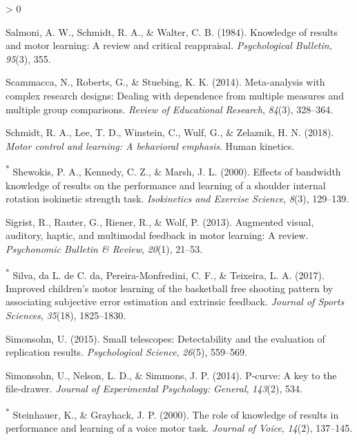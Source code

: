 \documentclass[
  english,
  man,mask,floatsintext]{apa7}
\newlength{\cslhangindent}
\newenvironment{CSLReferences}[2] %
 {%
  \setlength{\parindent}{0pt}
  \ifodd #1 \everypar{\setlength{\hangindent}{\cslhangindent}}\ignorespaces\fi
  \ifnum #2 > 0
  \setlength{\parskip}{#2\baselineskip}
  \fi
 }%
 {}
\begin{document}
\begin{CSLReferences}{1}{0}
\leavevmode\hypertarget{ref-Salmoni1984}{}%
Salmoni, A. W., Schmidt, R. A., \& Walter, C. B. (1984). Knowledge of results and motor learning: A review and critical reappraisal. \emph{Psychological Bulletin}, \emph{95}(3), 355.

\leavevmode\hypertarget{ref-Scammacca2014}{}%
Scammacca, N., Roberts, G., \& Stuebing, K. K. (2014). Meta-analysis with complex research designs: Dealing with dependence from multiple measures and multiple group comparisons. \emph{Review of Educational Research}, \emph{84}(3), 328--364.

\leavevmode\hypertarget{ref-Schmidt2018}{}%
Schmidt, R. A., Lee, T. D., Winstein, C., Wulf, G., \& Zelaznik, H. N. (2018). \emph{Motor control and learning: A behavioral emphasis}. Human kinetics.

\leavevmode\hypertarget{ref-Shewokis2000}{}%
\textsuperscript{*} Shewokis, P. A., Kennedy, C. Z., \& Marsh, J. L. (2000). Effects of bandwidth knowledge of results on the performance and learning of a shoulder internal rotation isokinetic strength task. \emph{Isokinetics and Exercise Science}, \emph{8}(3), 129--139.

\leavevmode\hypertarget{ref-Sigrist2013}{}%
Sigrist, R., Rauter, G., Riener, R., \& Wolf, P. (2013). Augmented visual, auditory, haptic, and multimodal feedback in motor learning: A review. \emph{Psychonomic Bulletin \& Review}, \emph{20}(1), 21--53.

\leavevmode\hypertarget{ref-Silva2017}{}%
\textsuperscript{*} Silva, da L. de C. da, Pereira-Monfredini, C. F., \& Teixeira, L. A. (2017). Improved children's motor learning of the basketball free shooting pattern by associating subjective error estimation and extrinsic feedback. \emph{Journal of Sports Sciences}, \emph{35}(18), 1825--1830.

\leavevmode\hypertarget{ref-Simonsohn2015}{}%
Simonsohn, U. (2015). Small telescopes: Detectability and the evaluation of replication results. \emph{Psychological Science}, \emph{26}(5), 559--569.

\leavevmode\hypertarget{ref-Simonsohn2014}{}%
Simonsohn, U., Nelson, L. D., \& Simmons, J. P. (2014). P-curve: A key to the file-drawer. \emph{Journal of Experimental Psychology: General}, \emph{143}(2), 534.

\leavevmode\hypertarget{ref-Steinhauer2000}{}%
\textsuperscript{*} Steinhauer, K., \& Grayhack, J. P. (2000). The role of knowledge of results in performance and learning of a voice motor task. \emph{Journal of Voice}, \emph{14}(2), 137--145.


\end{CSLReferences}
\end{document}

